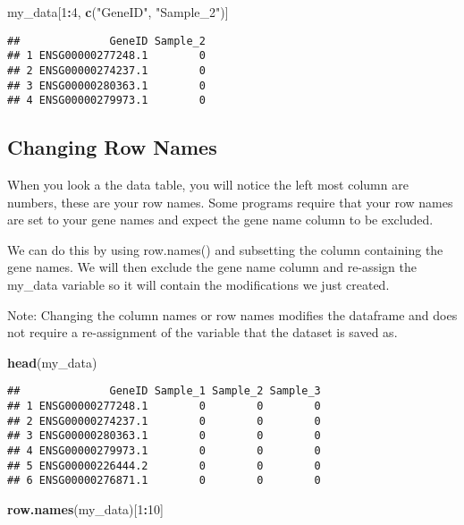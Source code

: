 \documentclass[]{article}
\newenvironment{Shaded}{\begin{snugshade}}{\end{snugshade}}
\newcommand{\KeywordTok}[1]{\textcolor[rgb]{0.13,0.29,0.53}{\textbf{#1}}}
\newcommand{\DecValTok}[1]{\textcolor[rgb]{0.00,0.00,0.81}{#1}}
\newcommand{\StringTok}[1]{\textcolor[rgb]{0.31,0.60,0.02}{#1}}
\newcommand{\OperatorTok}[1]{\textcolor[rgb]{0.81,0.36,0.00}{\textbf{#1}}}
\newcommand{\NormalTok}[1]{#1}
\begin{document}
\begin{Shaded}
\begin{Highlighting}[]
\NormalTok{my_data[}\DecValTok{1}\OperatorTok{:}\DecValTok{4}\NormalTok{, }\KeywordTok{c}\NormalTok{(}\StringTok{"GeneID"}\NormalTok{, }\StringTok{"Sample_2"}\NormalTok{)]}
\end{Highlighting}
\end{Shaded}

\begin{verbatim}
##              GeneID Sample_2
## 1 ENSG00000277248.1        0
## 2 ENSG00000274237.1        0
## 3 ENSG00000280363.1        0
## 4 ENSG00000279973.1        0
\end{verbatim}

\subsection{Changing Row Names}\label{changing-row-names}

When you look a the data table, you will notice the left most column are
numbers, these are your row names. Some programs require that your row
names are set to your gene names and expect the gene name column to be
excluded.

We can do this by using row.names() and subsetting the column containing
the gene names. We will then exclude the gene name column and re-assign
the my\_data variable so it will contain the modifications we just
created.

Note: Changing the column names or row names modifies the dataframe and
does not require a re-assignment of the variable that the dataset is
saved as.

\begin{Shaded}
\begin{Highlighting}[]
\KeywordTok{head}\NormalTok{(my_data)}
\end{Highlighting}
\end{Shaded}

\begin{verbatim}
##              GeneID Sample_1 Sample_2 Sample_3
## 1 ENSG00000277248.1        0        0        0
## 2 ENSG00000274237.1        0        0        0
## 3 ENSG00000280363.1        0        0        0
## 4 ENSG00000279973.1        0        0        0
## 5 ENSG00000226444.2        0        0        0
## 6 ENSG00000276871.1        0        0        0
\end{verbatim}

\begin{Shaded}
\begin{Highlighting}[]
\KeywordTok{row.names}\NormalTok{(my_data)[}\DecValTok{1}\OperatorTok{:}\DecValTok{10}\NormalTok{]}
\end{Highlighting}
\end{Shaded}
\end{document}
